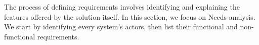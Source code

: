 \documentclass[12pt]{book}
\begin{document}

The process of defining requirements involves identifying and explaining the features offered by the solution itself. In this section, we focus on Needs analysis. We start by identifying every system's actors, then list their functional and non-functional requirements.
\end{document}
